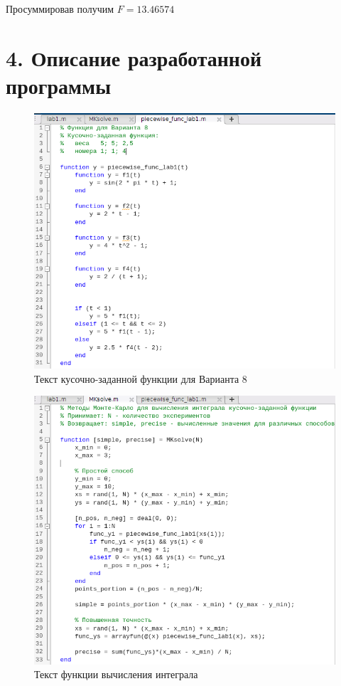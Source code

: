 \documentclass[12pt]{article}
\begin{document}
Просуммировав получим $F = 13.46574$
 
\newpage
 \section*{4. Описание разработанной программы}
 
\begin{figure}[!h]
	\centering
	\includegraphics[width=\linewidth]{piecewise_func.png}
	\caption{Текст кусочно-заданной функции для Варианта 8}
\end{figure}
 
\begin{figure}[!h]
	\centering
	\includegraphics[width=\linewidth]{MKsolve.png}
	\caption{Текст функции вычисления интеграла}
\end{figure}
\end{document}
